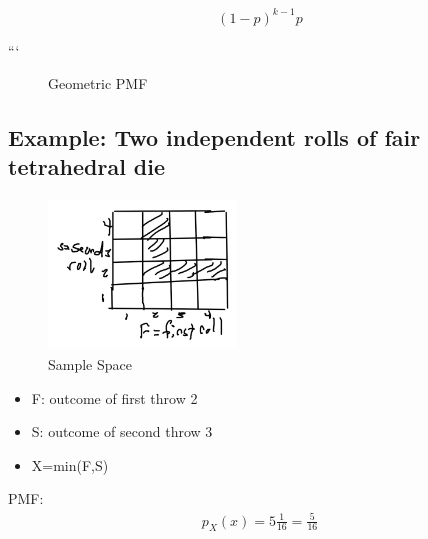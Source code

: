 
$$(1-p)^{k-1}p$$

```

\edef\mylst{"p","p(1-p)"}

\begin{figure}[h]
\centering

\caption{Geometric PMF}
\end{figure}

\subsection{Example: Two independent rolls of fair tetrahedral die}


\begin{figure}[h]
\centering
\includegraphics[width=5cm, height=4cm]{images/L05/min_2die_roll.jpeg}
\caption{Sample Space}
\end{figure}

\begin{itemize}
    \item F: outcome of first throw 2
    \item S: outcome of second throw 3
    \item X=min(F,S)
\end{itemize}

PMF: 
\begin{align*}
p_X(x)=5\frac{1}{16}=\frac{5}{16}
\end{align*}

